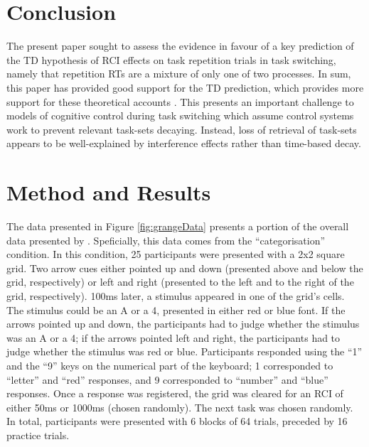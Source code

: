 \documentclass[a4paper, man, natbib]{apa6}
\begin{document}
\section{Conclusion}
The present paper sought to assess the evidence in favour of a key prediction of the TD hypothesis of RCI effects on task repetition trials in task switching, namely that repetition RTs are a mixture of only one of two processes. In sum, this paper has provided good support for the TD prediction, which provides more support for these theoretical accounts \citep{Grange2015, Horoufchin2011, Horoufchin2011a}. This presents an important challenge to models of cognitive control during task switching which assume control systems work to prevent relevant task-sets decaying. Instead, loss of retrieval of task-sets appears to be well-explained by interference effects rather than time-based decay.





\appendix
\section{Method and Results \citep{Grangeinrevision}}
The data presented in Figure \ref{fig:grangeData} presents a portion of the overall data presented by \cite{Grangeinrevision}. Speficially, this data comes from the ``categorisation'' condition. In this condition, 25 participants were presented with a 2x2 square grid. Two arrow cues either pointed up and down (presented above and below the grid, respectively) or left and right (presented to the left and to the right of the grid, respectively). 100ms later, a stimulus appeared in one of the grid's cells. The stimulus could be an A or a 4, presented in either red or blue font. If the arrows pointed up and down, the participants had to judge whether the stimulus was an A or a 4; if the arrows pointed left and right, the participants had to judge whether the stimulus was red or blue. Participants responded using the ``1'' and the ``9'' keys on the numerical part of the keyboard; 1 corresponded to ``letter'' and ``red'' responses, and 9 corresponded to ``number'' and ``blue'' responses. Once a response was registered, the grid was cleared for an RCI of either 50ms or 1000ms (chosen randomly). The next task was chosen randomly. In total, participants were presented with 6 blocks of 64 trials, preceded by 16 practice trials.
\end{document}
